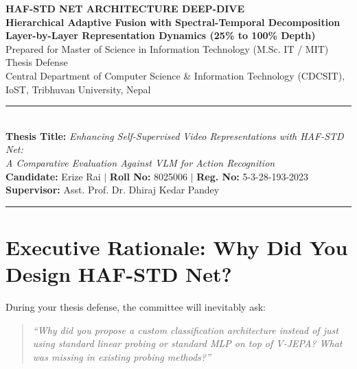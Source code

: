 \documentclass[a4paper, 11pt]{article}
\begin{document}
\begin{center}
  {\fontsize{18}{22}\selectfont \textbf{\color{primaryblue}HAF-STD NET ARCHITECTURE DEEP-DIVE}}\\[3pt]
  {\fontsize{13}{16}\selectfont \textbf{\color{accentdark}Hierarchical Adaptive Fusion with Spectral-Temporal Decomposition}}\\[3pt]
  {\fontsize{11}{14}\selectfont \textbf{Layer-by-Layer Representation Dynamics (25\% to 100\% Depth)}}\\[3pt]
  {\fontsize{10}{13}\selectfont Prepared for Master of Science in Information Technology (M.Sc. IT / MIT) Thesis Defense}\\[2pt]
  {\fontsize{10}{13}\selectfont Central Department of Computer Science \& Information Technology (CDCSIT), IoST, Tribhuvan University, Nepal}\\[6pt]
  \rule{\textwidth}{1.2pt}\\[5pt]
  {\fontsize{10}{13}\selectfont \textbf{Thesis Title:} \textit{Enhancing Self-Supervised Video Representations with HAF-STD Net:}}\\
  {\fontsize{10}{13}\selectfont \textit{A Comparative Evaluation Against VLM for Action Recognition}}\\[5pt]
  \textbf{Candidate:} Erize Rai \quad$|$ \quad \textbf{Roll No:} 8025006 \quad$|$ \quad \textbf{Reg. No:} 5-3-28-193-2023\\
  \textbf{Supervisor:} Asst. Prof. Dr. Dhiraj Kedar Pandey\\[2pt]
  \rule{\textwidth}{0.6pt}
\end{center}

\vspace{0.2cm}
\tableofcontents
\newpage

\section{Executive Rationale: Why Did You Design HAF-STD Net?}

During your thesis defense, the committee will inevitably ask:
\begin{quote}
    \textit{``Why did you propose a custom classification architecture instead of just using standard linear probing or standard MLP on top of V-JEPA? What was missing in existing probing methods?''}
\end{quote}
\end{document}
